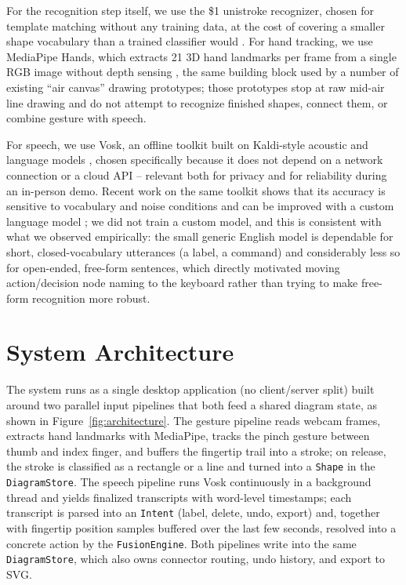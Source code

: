 \documentclass[sigconf]{acmart}
\begin{document}
For the recognition step itself, we use the \$1 unistroke recognizer,
chosen for template matching without any training data, at the cost of
covering a smaller shape vocabulary than a trained classifier would
\cite{wobbrock2007}. For hand tracking, we use MediaPipe Hands, which
extracts 21 3D hand landmarks per frame from a single RGB image without
depth sensing \cite{mediapipe2020}, the same building block used by a
number of existing ``air canvas'' drawing prototypes; those prototypes stop
at raw mid-air line drawing and do not attempt to recognize finished
shapes, connect them, or combine gesture with speech.

For speech, we use Vosk, an offline toolkit built on Kaldi-style acoustic
and language models \cite{kaldi2011}, chosen specifically because it does
not depend on a network connection or a cloud API -- relevant both for
privacy and for reliability during an in-person demo. Recent work on the
same toolkit shows that its accuracy is sensitive to vocabulary and noise
conditions and can be improved with a custom language model
\cite{vosk2025}; we did not train a custom model, and this is consistent
with what we observed empirically: the small generic English model is
dependable for short, closed-vocabulary utterances (a label, a command)
and considerably less so for open-ended, free-form sentences, which
directly motivated moving action/decision node naming to the keyboard
rather than trying to make free-form recognition more robust.

\section{System Architecture}

The system runs as a single desktop application (no client/server split)
built around two parallel input pipelines that both feed a shared diagram
state, as shown in Figure~\ref{fig:architecture}. The gesture pipeline
reads webcam frames, extracts hand landmarks with MediaPipe, tracks the
pinch gesture between thumb and index finger, and buffers the fingertip
trail into a stroke; on release, the stroke is classified as a rectangle
or a line and turned into a \texttt{Shape} in the \texttt{DiagramStore}.
The speech pipeline runs Vosk continuously in a background thread and
yields finalized transcripts with word-level timestamps; each transcript
is parsed into an \texttt{Intent} (label, delete, undo, export) and,
together with fingertip position samples buffered over the last few
seconds, resolved into a concrete action by the \texttt{FusionEngine}.
Both pipelines write into the same \texttt{DiagramStore}, which also owns
connector routing, undo history, and export to SVG.
\end{document}
